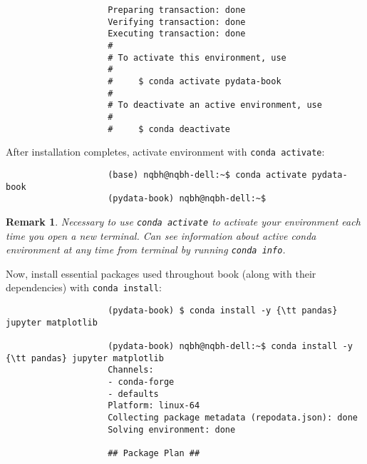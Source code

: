 \documentclass{article}
\newtheorem{remark}{Remark}
\begin{document}
\begin{enumerate}
\begin{itemize}
\begin{itemize}
\begin{itemize}
\begin{verbatim}
					Preparing transaction: done                                                     
					Verifying transaction: done                                                     
					Executing transaction: done                                                     
					#                                                                               
					# To activate this environment, use                                             
					#                                                                               
					#     $ conda activate pydata-book                                              
					#                                                                               
					# To deactivate an active environment, use                                      
					#                                                                               
					#     $ conda deactivate
				\end{verbatim}
				After installation completes, activate environment with {\tt conda activate}:
				\begin{verbatim}
					(base) nqbh@nqbh-dell:~$ conda activate pydata-book                             
					(pydata-book) nqbh@nqbh-dell:~$
				\end{verbatim}
				
				\begin{remark}
					Necessary to use {\tt conda activate} to activate your environment each time you open a new terminal. Can see information about active conda environment at any time from terminal by running {\tt conda info}.
				\end{remark}
				Now, install essential packages used throughout book (along with their dependencies) with {\tt conda install}:
				\begin{verbatim}
					(pydata-book) $ conda install -y {\tt pandas} jupyter matplotlib
					
					(pydata-book) nqbh@nqbh-dell:~$ conda install -y {\tt pandas} jupyter matplotlib      
					Channels:                                                                       
					- conda-forge                                                                  
					- defaults                                                                     
					Platform: linux-64                                                              
					Collecting package metadata (repodata.json): done                               
					Solving environment: done                                                       
					
					## Package Plan ##                                                              
					

\end{verbatim}
\end{itemize}
\end{itemize}
\end{itemize}
\end{enumerate}
\end{document}
